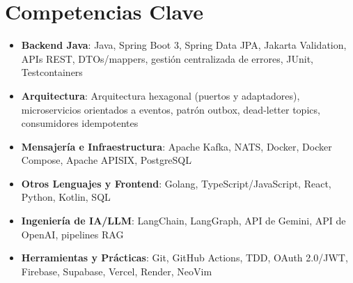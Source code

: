 \documentclass[11pt,a4paper,sans]{moderncv}
\begin{document}
\section{Competencias Clave}
\vspace{1pt}
\begin{itemize}

\item \textbf{Backend Java}: Java, Spring Boot 3, Spring Data JPA, Jakarta Validation, APIs REST, DTOs/mappers, gestión centralizada de errores, JUnit, Testcontainers

\item \textbf{Arquitectura}: Arquitectura hexagonal (puertos y adaptadores), microservicios orientados a eventos, patrón outbox, dead-letter topics, consumidores idempotentes

\item \textbf{Mensajería e Infraestructura}: Apache Kafka, NATS, Docker, Docker Compose, Apache APISIX, PostgreSQL

\item \textbf{Otros Lenguajes y Frontend}: Golang, TypeScript/JavaScript, React, Python, Kotlin, SQL

\item \textbf{Ingeniería de IA/LLM}: LangChain, LangGraph, API de Gemini, API de OpenAI, pipelines RAG

\item \textbf{Herramientas y Prácticas}: Git, GitHub Actions, TDD, OAuth 2.0/JWT, Firebase, Supabase, Vercel, Render, NeoVim

\end{itemize}

\end{document}
